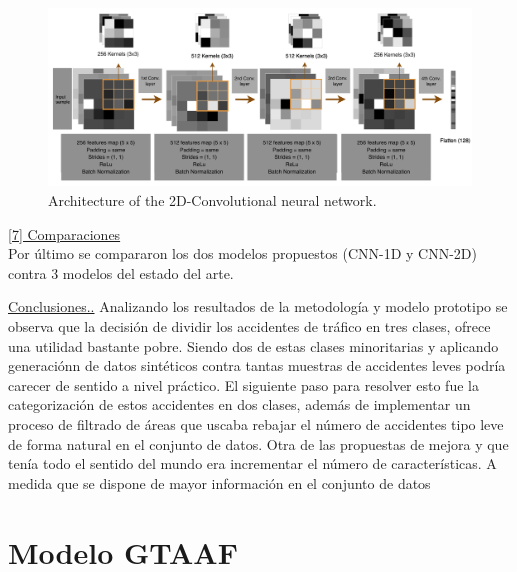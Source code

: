 \documentclass{uathesis-es}
\begin{document}
\begin{figure}[H]
	\centering
	\includegraphics[width=16cm]{Figures/1stPaper/TASPCNN.png}
	\caption{Architecture of the 2D-Convolutional neural network.}
	\label{TASPCNNIMAGE}
\end{figure}

\underline{[7] Comparaciones}\\
Por último se compararon los dos modelos propuestos (CNN-1D y CNN-2D) contra 3 modelos del estado del arte.


\underline{Conclusiones..}
Analizando los resultados de la metodología y modelo prototipo se observa que la decisión de dividir los accidentes de tráfico en tres clases, ofrece una utilidad bastante pobre. Siendo dos de estas clases minoritarias y aplicando generaciónn de datos sintéticos contra tantas muestras de accidentes leves podría carecer de sentido a nivel práctico.
El siguiente paso para resolver esto fue la categorización de estos accidentes en dos clases, además de implementar un proceso de filtrado de áreas que uscaba rebajar el número de accidentes tipo leve de forma natural en el conjunto de datos.
Otra de las propuestas de mejora y que tenía todo el sentido del mundo era incrementar el número de características. A medida que se dispone de mayor información en el conjunto de datos

\section{Modelo GTAAF}
\end{document}
